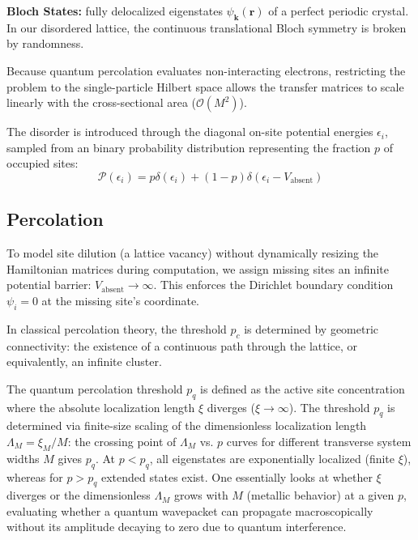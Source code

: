 \documentclass[11pt,a4paper]{article}
\begin{document}
\textbf{Bloch States:} fully delocalized eigenstates $\psi_{\mathbf{k}}(\mathbf{r})$ of a perfect periodic crystal. In our disordered lattice, the continuous translational Bloch symmetry is broken by randomness.

Because quantum percolation evaluates non-interacting electrons, restricting the problem to the single-particle Hilbert space allows the transfer matrices to scale linearly with the cross-sectional area ($\mathcal{O}(M^2)$). 

The disorder is introduced through the diagonal on-site potential energies $\epsilon_i$, sampled from an binary probability distribution representing the fraction $p$ of occupied sites:
\begin{equation}
\mathcal{P}(\epsilon_i) = p \delta(\epsilon_i) + (1-p) \delta(\epsilon_i - V_{\text{absent}})
\end{equation}

\subsection{Percolation}

To model site dilution (a lattice vacancy) without dynamically resizing the Hamiltonian matrices during computation, we assign missing sites an infinite potential barrier: $V_{\text{absent}} \to \infty$. This enforces the Dirichlet boundary condition $\psi_i = 0$ at the missing site's coordinate. 

In classical percolation theory, the threshold $p_c$ is determined by geometric connectivity: the existence of a continuous path through the lattice, or equivalently, an infinite cluster. 

The quantum percolation threshold $p_q$ is defined as the active site concentration where the absolute localization length $\xi$ diverges ($\xi \to \infty$). The threshold $p_q$ is determined via finite-size scaling of the dimensionless localization length $\Lambda_M=\xi_M/M$: the crossing point of $\Lambda_M$ vs. $p$ curves for different transverse system widths $M$ gives $p_q$. At $p<p_q$, all eigenstates are exponentially localized (finite $\xi$), whereas for $p>p_q$ extended states exist. One essentially looks at whether $\xi$ diverges or the dimensionless $\Lambda_M$ grows with $M$ (metallic behavior) at a given $p$, evaluating whether a quantum wavepacket can propagate macroscopically without its amplitude decaying to zero due to quantum interference.
\end{document}

